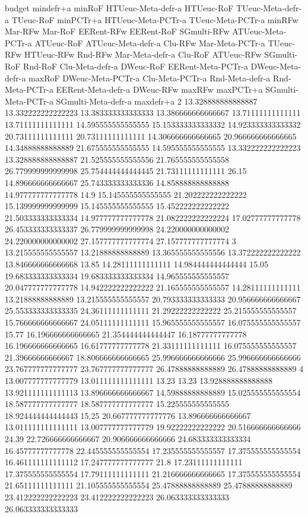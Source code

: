 budget mindefr+a minRoF HTUeuc-Meta-defr-a HTUeuc-RoF TUeuc-Meta-defr-a TUeuc-RoF minPCTr+a HTUeuc-Meta-PCTr-a TUeuc-Meta-PCTr-a minRFw Mar-RFw Mar-RoF EERent-RFw EERent-RoF SGmulti-RFw ATUeuc-Meta-PCTr-a ATUeuc-RoF ATUeuc-Meta-defr-a Clu-RFw Mar-Meta-PCTr-a TUeuc-RFw HTUeuc-RFw Rnd-RFw Mar-Meta-defr-a Clu-RoF ATUeuc-RFw SGmulti-RoF Rnd-RoF Clu-Meta-defr-a DWeuc-RoF EERent-Meta-PCTr-a DWeuc-Meta-defr-a maxRoF DWeuc-Meta-PCTr-a Clu-Meta-PCTr-a Rnd-Meta-defr-a Rnd-Meta-PCTr-a EERent-Meta-defr-a DWeuc-RFw maxRFw maxPCTr+a SGmulti-Meta-PCTr-a SGmulti-Meta-defr-a maxdefr+a
2 13.328888888888887 13.332222222222223 13.383333333333333 13.386666666666667 13.71111111111111 13.71111111111111 14.595555555555555 15.153333333333332 14.923333333333332 20.73111111111111 20.73111111111111 14.306666666666665 20.966666666666665 14.34888888888889 21.675555555555555 14.595555555555555 13.332222222222223 13.328888888888887 21.525555555555556 21.765555555555558 26.779999999999998 25.754444444444445 21.73111111111111 26.15 14.896666666666667 25.743333333333336 14.858888888888888 14.977777777777778 14.9 15.145555555555555 21.202222222222222 15.139999999999999 15.145555555555555 15.452222222222222 21.503333333333334 14.977777777777778 21.082222222222224 17.02777777777778 26.453333333333337 26.779999999999998 24.220000000000002 24.220000000000002 27.157777777777774 27.157777777777774
3 13.215555555555557 13.21888888888889 13.365555555555556 13.372222222222222 13.846666666666668 13.85 14.28111111111111 14.984444444444444 15.05 19.683333333333334 19.683333333333334 14.965555555555557 20.047777777777778 14.942222222222222 21.165555555555557 14.28111111111111 13.21888888888889 13.215555555555557 20.793333333333333 20.956666666666667 25.553333333333335 24.36111111111111 21.29222222222222 25.215555555555557 15.766666666666667 24.05111111111111 15.965555555555557 16.075555555555557 15.77 16.196666666666665 21.354444444444447 16.18777777777778 16.196666666666665 16.61777777777778 21.33111111111111 16.075555555555557 21.39666666666667 18.806666666666665 25.996666666666666 25.996666666666666 23.767777777777777 23.767777777777777 26.47888888888889 26.47888888888889
4 13.007777777777779 13.011111111111111 13.23 13.23 13.928888888888888 13.921111111111113 13.896666666666667 14.59888888888889 15.025555555555554 18.587777777777777 18.587777777777777 15.225555555555555 18.924444444444443 15.25 20.667777777777776 13.896666666666667 13.011111111111111 13.007777777777779 19.92222222222222 20.516666666666666 24.39 22.726666666666667 20.906666666666666 24.683333333333334 16.45777777777778 22.445555555555554 17.235555555555557 17.375555555555554 16.461111111111112 17.247777777777777 21.8 17.23111111111111 17.375555555555554 17.79111111111111 21.216666666666665 17.375555555555554 21.65111111111111 21.105555555555554 25.47888888888889 25.47888888888889 23.412222222222223 23.412222222222223 26.063333333333333 26.063333333333333
